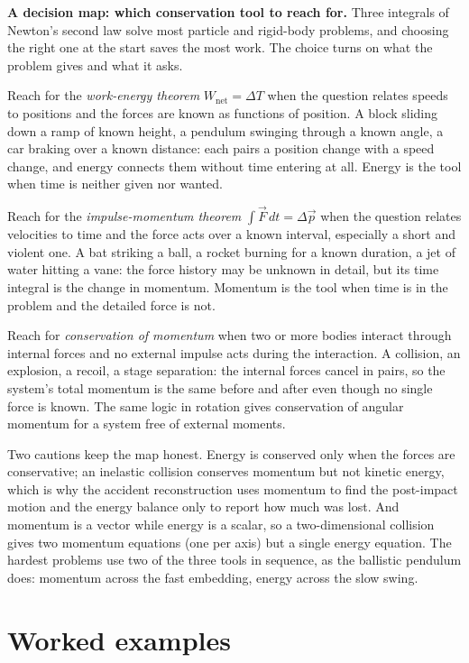 \begin{mastery}
\textbf{A decision map: which conservation tool to reach for.} Three
integrals of Newton's second law solve most particle and rigid-body
problems, and choosing the right one at the start saves the most work.
The choice turns on what the problem gives and what it asks.

Reach for the \emph{work-energy theorem} $W_{\text{net}}=\Delta T$ when
the question relates speeds to positions and the forces are known as
functions of position. A block sliding down a ramp of known height, a
pendulum swinging through a known angle, a car braking over a known
distance: each pairs a position change with a speed change, and energy
connects them without time entering at all. Energy is the tool when
time is neither given nor wanted.

Reach for the \emph{impulse-momentum theorem} $\int\vec{F}\,dt=\Delta
\vec{p}$ when the question relates velocities to time and the force
acts over a known interval, especially a short and violent one. A bat
striking a ball, a rocket burning for a known duration, a jet of water
hitting a vane: the force history may be unknown in detail, but its
time integral is the change in momentum. Momentum is the tool when time
is in the problem and the detailed force is not.

Reach for \emph{conservation of momentum} when two or more bodies
interact through internal forces and no external impulse acts during
the interaction. A collision, an explosion, a recoil, a stage
separation: the internal forces cancel in pairs, so the system's total
momentum is the same before and after even though no single force is
known. The same logic in rotation gives conservation of angular
momentum for a system free of external moments.

Two cautions keep the map honest. Energy is conserved only when the
forces are conservative; an inelastic collision conserves momentum but
not kinetic energy, which is why the accident reconstruction uses
momentum to find the post-impact motion and the energy balance only to
report how much was lost. And momentum is a vector while energy is a
scalar, so a two-dimensional collision gives two momentum equations
(one per axis) but a single energy equation. The hardest problems use
two of the three tools in sequence, as the ballistic pendulum does:
momentum across the fast embedding, energy across the slow swing.
\end{mastery}

\section{Worked examples}


